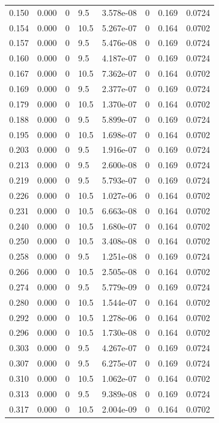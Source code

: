 \documentclass[preview]{standalone}
\begin{document}
{{\begin{tabular}{L{1.2cm}C{1.2cm} C{0.3cm}C{0.5cm} C{1.4cm}C{1.4cm} C{1.4cm}C{1.4cm}}
  0.150  &  0.000  & 0     & 9.5 &  3.578e-08  & 0  & 0.169 &  0.0724   \\ 
  0.154  &  0.000  & 0     & 10.5 &  5.267e-07  & 0  & 0.164 &  0.0702   \\ 
  0.157  &  0.000  & 0     & 9.5 &  5.476e-08  & 0  & 0.169 &  0.0724   \\ 
  0.160  &  0.000  & 0     & 9.5 &  4.187e-07  & 0  & 0.169 &  0.0724   \\ 
  0.167  &  0.000  & 0     & 10.5 &  7.362e-07  & 0  & 0.164 &  0.0702   \\ 
  0.169  &  0.000  & 0     & 9.5 &  2.377e-07  & 0  & 0.169 &  0.0724   \\ 
  0.179  &  0.000  & 0     & 10.5 &  1.370e-07  & 0  & 0.164 &  0.0702   \\ 
  0.188  &  0.000  & 0     & 9.5 &  5.899e-07  & 0  & 0.169 &  0.0724   \\ 
  0.195  &  0.000  & 0     & 10.5 &  1.698e-07  & 0  & 0.164 &  0.0702   \\ 
  0.203  &  0.000  & 0     & 9.5 &  1.916e-07  & 0  & 0.169 &  0.0724   \\ 
  0.213  &  0.000  & 0     & 9.5 &  2.600e-08  & 0  & 0.169 &  0.0724   \\ 
  0.219  &  0.000  & 0     & 9.5 &  5.793e-07  & 0  & 0.169 &  0.0724   \\ 
  0.226  &  0.000  & 0     & 10.5 &  1.027e-06  & 0  & 0.164 &  0.0702   \\ 
  0.231  &  0.000  & 0     & 10.5 &  6.663e-08  & 0  & 0.164 &  0.0702   \\ 
  0.240  &  0.000  & 0     & 10.5 &  1.680e-07  & 0  & 0.164 &  0.0702   \\ 
  0.250  &  0.000  & 0     & 10.5 &  3.408e-08  & 0  & 0.164 &  0.0702   \\ 
  0.258  &  0.000  & 0     & 9.5 &  1.251e-08  & 0  & 0.169 &  0.0724   \\ 
  0.266  &  0.000  & 0     & 10.5 &  2.505e-08  & 0  & 0.164 &  0.0702   \\ 
  0.274  &  0.000  & 0     & 9.5 &  5.779e-09  & 0  & 0.169 &  0.0724   \\ 
  0.280  &  0.000  & 0     & 10.5 &  1.544e-07  & 0  & 0.164 &  0.0702   \\ 
  0.292  &  0.000  & 0     & 10.5 &  1.278e-06  & 0  & 0.164 &  0.0702   \\ 
  0.296  &  0.000  & 0     & 10.5 &  1.730e-08  & 0  & 0.164 &  0.0702   \\ 
  0.303  &  0.000  & 0     & 9.5 &  4.267e-07  & 0  & 0.169 &  0.0724   \\ 
  0.307  &  0.000  & 0     & 9.5 &  6.275e-07  & 0  & 0.169 &  0.0724   \\ 
  0.310  &  0.000  & 0     & 10.5 &  1.062e-07  & 0  & 0.164 &  0.0702   \\ 
  0.313  &  0.000  & 0     & 9.5 &  9.389e-08  & 0  & 0.169 &  0.0724   \\ 
  0.317  &  0.000  & 0     & 10.5 &  2.004e-09  & 0  & 0.164 &  0.0702   \\ 
\hline 
\end{tabular} 

}}
\end{document}
